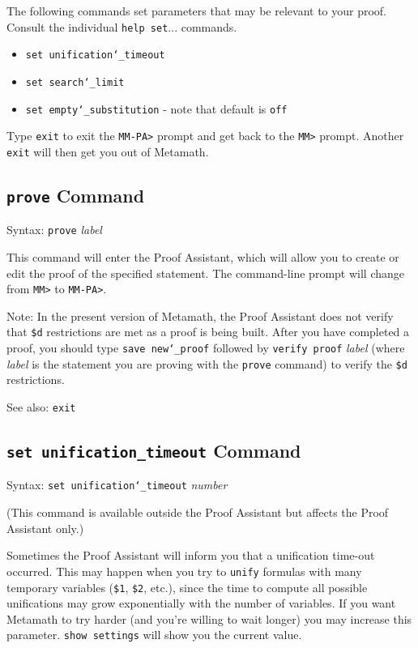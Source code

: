 The following commands set parameters that may be relevant to your proof.
Consult the individual \texttt{help set}... commands.
\begin{itemize}
   \item[] \texttt{set unification{\char`\_}timeout}
 \item[]
    \texttt{set search{\char`\_}limit}
  \item[]
    \texttt{set empty{\char`\_}substitution} - note that default is \texttt{off}
\end{itemize}

Type \texttt{exit} to exit the \texttt{MM-PA>}
 prompt and get back to the \texttt{MM>} prompt.
Another \texttt{exit} will then get you out of Metamath.



\subsection{\texttt{prove} Command}
Syntax:  \texttt{prove} {\em label}

This command will enter the Proof Assistant, which will
allow you to create or edit the proof of the specified statement.
The command-line prompt will change from \texttt{MM>} to \texttt{MM-PA>}.

Note:  In the present version of
Metamath, the Proof
Assistant does not verify that \texttt{\$d} restrictions are met as a proof is being built.  After you
have completed a proof, you should type \texttt{save new{\char`\_}proof}
followed by \texttt{verify proof} {\em label} (where {\em label} is the
statement you are proving with the \texttt{prove} command) to verify the
\texttt{\$d} restrictions.

See also: \texttt{exit}

\subsection{\texttt{set unification\_timeout} Command}
Syntax:  \texttt{set unification{\char`\_}timeout} {\em number}

(This command is available outside the Proof Assistant but affects the
Proof Assistant only.)

Sometimes the Proof Assistant will inform you that a unification
time-out occurred.  This may happen when you try to \texttt{unify}
formulas with many temporary variables
(\texttt{\$1}, \texttt{\$2}, etc.), since the time to compute all possible
unifications may grow exponentially with the number of variables.  If
you want Metamath to try harder (and you're willing to wait longer) you
may increase this parameter.  \texttt{show settings} will show you the
current value.

